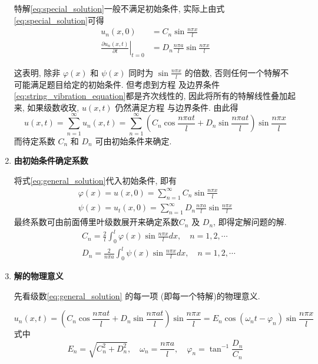 \begin{enumerate}
    特解\eqref{eq:special_solution}一般不满足初始条件, 实际上由式\eqref{eq:special_solution}可得 
    $$
    \begin{aligned}
    u_{n}(x, 0) & =C_{n} \sin \frac{n \pi x}{l} \\
    \left.\frac{\partial u_{n}(x, t)}{\partial t}\right|_{t=0} & =D_{n} \frac{n \pi a}{l} \sin \frac{n \pi x}{l}
    \end{aligned}
    $$

    这表明, 除非 $\varphi(x)$ 和 $\psi(x)$ 同时为 $\sin \frac{n \pi x}{l}$ 的倍数,
     否则任何一个特解不可能满足题目给定的初始条件. 
     但考虑到方程  及边界条件\eqref{eq:string_vibration_equation}都是齐次线性的, 
     因此将所有的特解线性叠加起来, 如果级数收玫, $u(x, t)$ 仍然满足方程 与边界条件. 由此得
    \begin{equation}
        u(x, t)=\sum_{n=1}^{\infty} u_{n}(x, t)=
        \sum_{n=1}^{\infty}\left(C_{n} \cos \frac{n \pi a t}{l}+
        D_{n} \sin \frac{n \pi a t}{l}\right) \sin \frac{n \pi x}{l}
        \label{eq:general_solution}
    \end{equation}
    而待定系数 $C_{n}$ 和 $D_{n}$ 可由初始条件来确定.
    

    \item \textbf{由初始条件确定系数} 
    
        将式\eqref{eq:general_solution}代入初始条件, 即有
        $$
        \begin{gathered}
        \varphi(x)=u(x, 0)=\sum_{n=1}^{\infty} C_{n} \sin \frac{n \pi x}{l} \\
        \psi(x)=u_{t}(x, 0)=\sum_{n=1}^{\infty} D_{n} \frac{n \pi a}{l} \sin \frac{n \pi x}{l}
        \end{gathered}
        $$
        最终系数可由前面傅里叶级数展开来确定系数$C_{n}$ 及 $D_{n}$, 即得定解问题的解.
        $$
        \begin{aligned}
        & C_{n}=\frac{2}{l} \int_{0}^{l} \varphi(x) \sin \frac{n \pi x}{l} d x, \quad n=1,2, \cdots \\
        & D_{n}=\frac{2}{n \pi a} \int_{0}^{l} \psi(x) \sin \frac{n \pi x}{l} d x, \quad n=1,2, \cdots
        \end{aligned}
        $$


        \item \textbf{解的物理意义}
        
        先看级数\eqref{eq:general_solution} 的每一项 (即每一个特解)的物理意义.

        \begin{equation}
            u_{n}(x, t)=\left(C_{n} \cos \frac{n \pi a t}{l}+D_{n} \sin \frac{n \pi a t}{l}\right) \sin \frac{n \pi x}{l}
            =E_{n} \cos \left(\omega_{n} t-\varphi_{n}\right) \sin \frac{n \pi x}{l}
            \label{eq:solution_2}
        \end{equation}    
        式中
        $$
        E_{n}=\sqrt{C_{n}^{2}+D_{n}^{2}}, 
            \quad \omega_{n}=\frac{n \pi a}{l}, 
            \quad \varphi_{n}=\tan ^{-1} \frac{D_{n}}{C_{n}}
        $$
        

\end{enumerate}
